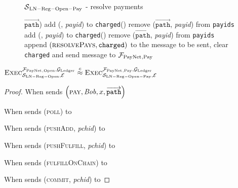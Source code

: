 \begin{figure}[H]
\begin{simulatorbox}{$\mathcal{S}{}_{\mathrm{LN - Reg - Open - Pay}}$ - resolve
  payments}
\begin{algorithmic}[1]
{            $\overrightarrow{\mathtt{path}}$)}
              \State add (\alice, \textit{payid}) to \texttt{charged}(\alice)
              \State remove ($\overrightarrow{\mathtt{path}}$, \textit{payid})
              from \texttt{payids}
             
              \State add (\alice, \textit{payid}) to \texttt{charged}(\alice)
              \State remove ($\overrightarrow{\mathtt{path}}$, \textit{payid})
              from \texttt{payids}
            \EndIf
          \EndFor
        \EndFor
        \State append $\left(\textsc{resolvePays}, \mathtt{charged}\right)$ to
        the message to be sent, clear \texttt{charged} and send message to
        $\mathcal{F}_{\mathrm{PayNet}}{}_{\mathrm{, Pay}}$
      \EndIndent
    \end{algorithmic}
  \end{simulatorbox}
  \caption{}
  \label{alg:sim:resolvepay}
\end{figure}

\begin{lemma}
  \label{lemma:pay}
  $\textsc{Exec}^{\mathcal{F}_{\mathrm{PayNet}}{}_{\mathrm{, Open}}, \mathcal{G}_{\mathrm{Ledger}}}_{\mathcal{S}_{\mathrm{LN
  - Reg - Open}}, \mathcal{E}} \overset{c}{\approx}
  \textsc{Exec}^{\mathcal{F}_{\mathrm{PayNet}}{}_{\mathrm{, Pay}}, \mathcal{G}_{\mathrm{Ledger}}}_{\mathcal{S}_{\mathrm{LN -
  Reg - Open - Pay}}, \mathcal{E}}$
\end{lemma}

\begin{proof}
  When \environment{} sends $\left(\textsc{pay}, \mathit{Bob}, x,
  \overrightarrow{\mathtt{path}}\right)$

  When \environment{} sends (\textsc{poll}) to \alice{}

  When \environment{} sends (\textsc{pushAdd}, \textit{pchid}) to \alice{}

  When \environment{} sends (\textsc{pushFulfill}, \textit{pchid}) to \alice{}

  When \environment{} sends (\textsc{fulfillOnChain}) to \alice{}

  When \environment{} sends (\textsc{commit}, \textit{pchid}) to \alice{}
\end{proof}
